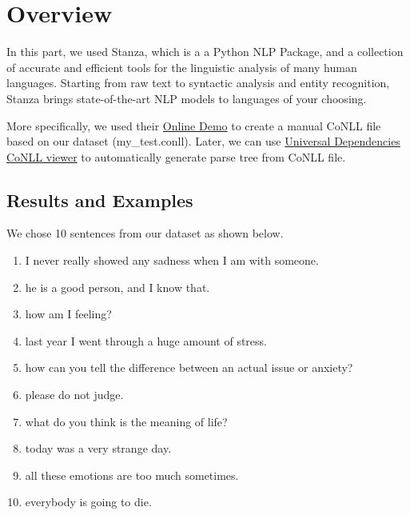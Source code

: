 \documentclass[12pt, a4paper]{article}
\begin{document}
\section{Overview}
In this part, we used Stanza, which is a a Python NLP Package, and a collection of accurate and efficient tools for the linguistic analysis of many human languages. Starting from raw text to syntactic analysis and entity recognition, Stanza brings state-of-the-art NLP models to languages of your choosing.

More specifically, we used their \href{http://stanza.run/}{Online Demo} to create a manual CoNLL file based on our dataset (my\_test.conll). Later, we can use \href{https://universaldependencies.org/conllu_viewer.html}{Universal Dependencies CoNLL viewer} to automatically generate parse tree from CoNLL file.

\subsection{Results and Examples}
We chose 10 sentences from our dataset as shown below.
\begin{enumerate}
	\item I never really showed any sadness when I am with someone.
	\item he is a good person, and I know that.
	\item how am I feeling?
	\item last year I went through a huge amount of stress.
	\item how can you tell the difference between an actual issue or anxiety?
	\item please do not judge.
	\item what do you think is the meaning of life?
	\item today was a very strange day.
	\item all these emotions are too much sometimes. 
	\item everybody is going to die.
\end{enumerate}
\end{document}
